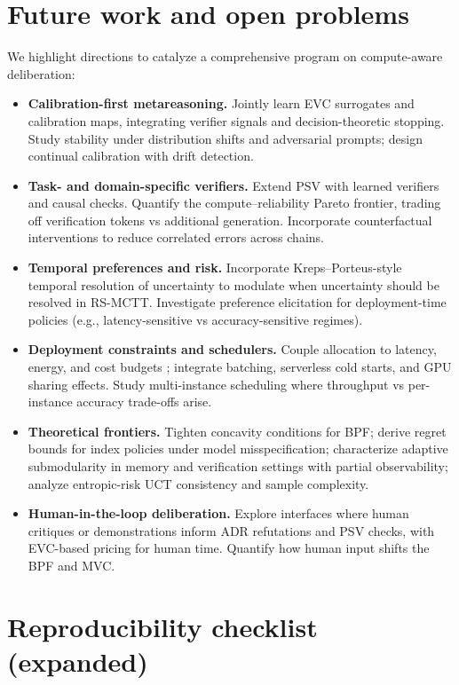 \section{Future work and open problems}
We highlight directions to catalyze a comprehensive program on compute-aware deliberation:
\begin{itemize}[leftmargin=1.6em, itemsep=0.2em]
\item \textbf{Calibration-first metareasoning.} Jointly learn EVC surrogates and calibration maps, integrating verifier signals and decision-theoretic stopping. Study stability under distribution shifts and adversarial prompts; design continual calibration with drift detection.
\item \textbf{Task- and domain-specific verifiers.} Extend PSV with learned verifiers and causal checks. Quantify the compute–reliability Pareto frontier, trading off verification tokens vs additional generation. Incorporate counterfactual interventions to reduce correlated errors across chains.
\item \textbf{Temporal preferences and risk.} Incorporate Kreps–Porteus-style temporal resolution of uncertainty \cite{kreps1978temporal} to modulate when uncertainty should be resolved in RS-MCTT. Investigate preference elicitation for deployment-time policies (e.g., latency-sensitive vs accuracy-sensitive regimes).
\item \textbf{Deployment constraints and schedulers.} Couple allocation to latency, energy, and cost budgets \cite{beloglazov2012cloud}; integrate batching, serverless cold starts, and GPU sharing effects. Study multi-instance scheduling where throughput vs per-instance accuracy trade-offs arise.
\item \textbf{Theoretical frontiers.} Tighten concavity conditions for BPF; derive regret bounds for index policies under model misspecification; characterize adaptive submodularity in memory and verification settings with partial observability; analyze entropic-risk UCT consistency and sample complexity.
\item \textbf{Human-in-the-loop deliberation.} Explore interfaces where human critiques or demonstrations inform ADR refutations and PSV checks, with EVC-based pricing for human time. Quantify how human input shifts the BPF and MVC.
\end{itemize}

\section{Reproducibility checklist (expanded)}

